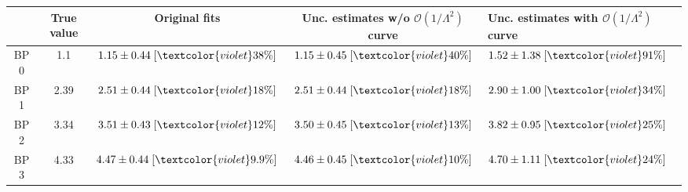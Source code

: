 \begin{tabular}{c|c|c|c|}
 & True value & Original fits & Unc. estimates w/o $\mathcal{O}(1/\Lambda^2)$ curve & Unc. estimates with $\mathcal{O}(1/\Lambda^2)$ curve\\
\hline\hline
BP 0 & 1.1 & $1.15\pm0.44\;[\textcolor{violet}{38\%}]$ & $1.15\pm0.45\;[\textcolor{violet}{40\%}]$ & $1.52\pm1.38\;[\textcolor{violet}{91\%}]$\\\hline
BP 1 & 2.39 & $2.51\pm0.44\;[\textcolor{violet}{18\%}]$ & $2.51\pm0.44\;[\textcolor{violet}{18\%}]$ & $2.90\pm1.00\;[\textcolor{violet}{34\%}]$\\\hline
BP 2 & 3.34 & $3.51\pm0.43\;[\textcolor{violet}{12\%}]$ & $3.50\pm0.45\;[\textcolor{violet}{13\%}]$ & $3.82\pm0.95\;[\textcolor{violet}{25\%}]$\\\hline
BP 3 & 4.33 & $4.47\pm0.44\;[\textcolor{violet}{9.9\%}]$ & $4.46\pm0.45\;[\textcolor{violet}{10\%}]$ & $4.70\pm1.11\;[\textcolor{violet}{24\%}]$\\
\end{tabular}
